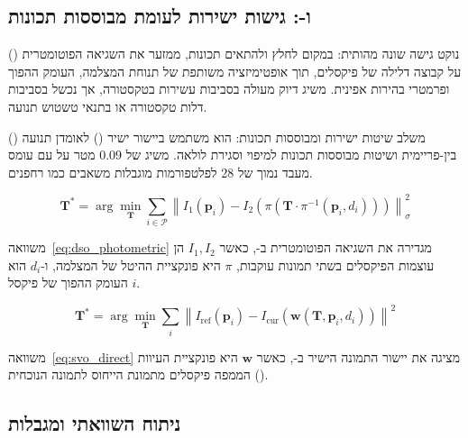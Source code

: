 \subsection{ ו-: גישות ישירות לעומת מבוססות תכונות}
\label{subsec:dso_svo}

 () נוקט גישה שונה מהותית:
במקום לחלץ ולהתאים תכונות,  ממזער את השגיאה הפוטומטרית
על קבוצה דלילה של פיקסלים, תוך אופטימיזציה משותפת של תנוחת
המצלמה, העומק ההפוך ופרמטרי בהירות אפינית.  משיג דיוק
מעולה בסביבות עשירות בטקסטורה, אך נכשל בסביבות דלות טקסטורה
או בתנאי טשטוש תנועה.

 () משלב שיטות ישירות
ומבוססות תכונות: הוא משתמש ביישור ישיר ()
לאומדן תנועה בין-פריימית ושיטות מבוססות תכונות למיפוי וסגירת
לולאה.  משיג  של 0.09 מטר על 
עם עומס מעבד נמוך של 28%
לפלטפורמות מוגבלות משאבים כמו רחפנים.

\begin{equation}
    \mathbf{T}^* = \arg\min_{\mathbf{T}} \sum_{i \in \mathcal{P}} \left\| I_1(\mathbf{p}_i) - I_2(\pi(\mathbf{T} \cdot \pi^{-1}(\mathbf{p}_i, d_i))) \right\|_{\sigma}^2
    \label{eq:dso_photometric}
\end{equation}

משוואה~\ref{eq:dso_photometric} מגדירה את השגיאה הפוטומטרית
ב-, כאשר $I_1, I_2$ הן עוצמות הפיקסלים בשתי תמונות
עוקבות, $\pi$ היא פונקציית ההיטל של המצלמה, ו-$d_i$ הוא העומק
ההפוך של פיקסל $i$.

\begin{equation}
    \mathbf{T}^* = \arg\min_{\mathbf{T}} \sum_{i} \left\| I_{\text{ref}}(\mathbf{p}_i) - I_{\text{cur}}(\mathbf{w}(\mathbf{T}, \mathbf{p}_i, d_i)) \right\|^2
    \label{eq:svo_direct}
\end{equation}

משוואה~\ref{eq:svo_direct} מציגה את יישור התמונה הישיר
ב-, כאשר $\mathbf{w}$ היא פונקציית העיוות
() הממפה פיקסלים מתמונת הייחוס לתמונה הנוכחית.

\subsection{ניתוח השוואתי ומגבלות}
\label{subsec:visual_comparison}

